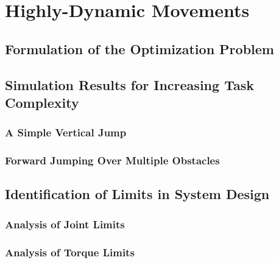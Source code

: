 
\chapter{Highly-Dynamic Movements}\label{c5}

\section{Formulation of the Optimization Problem}
\section{Simulation Results for Increasing Task Complexity}
\subsection{A Simple Vertical Jump}
\subsection{Forward Jumping Over Multiple Obstacles}
\section{Identification of Limits in System Design}
\subsection{Analysis of Joint Limits}
\subsection{Analysis of Torque Limits}


